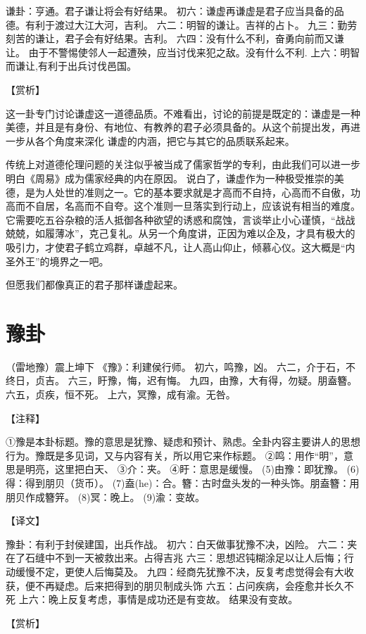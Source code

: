 \documentclass[12pt,UTF8]{ctexbook}
\begin{document}
谦卦：亨通。君子谦让将会有好结果。
初六：谦虚再谦虚是君子应当具备的品德。有利于渡过大江大河，吉利。
六二：明智的谦让。吉祥的占卜。
九三：勤劳刻苦的谦让，君子会有好结果。吉利。
六四：没有什么不利，奋勇向前而又谦让。 由于不警惕使邻人一起遭殃，应当讨伐来犯之敌。没有什么不利.
上六：明智而谦让,有利于出兵讨伐邑国。

【赏析】

这一卦专门讨论谦虚这一道德品质。不难看出，讨论的前提是既定的：谦虚是一种美德，并且是有身份、有地位、有教养的君子必须具备的。从这个前提出发，再进一步从各个角度来深化 谦虚的内涵，把它与其它的品质联系起来。

传统上对道德伦理问题的关注似乎被当成了儒家哲学的专利，由此我们可以进一步明白《周易》成为儒家经典的内在原因。 说白了，谦虚作为一种极受推崇的美德，是为人处世的准则之一。它的基本要求就是才高而不自持，心高而不自傲，功高而不自居，名高而不自夸。这个准则一旦落实到行动上，应该说有相当的难度。它需要吃五谷杂粮的活人抵御各种欲望的诱惑和腐蚀，言谈举止小心谨慎，“战战兢兢，如履薄冰”，克己复礼。从另一个角度讲，正因为难以企及，才具有极大的吸引力，才使君子鹤立鸡群，卓越不凡，让人高山仰止，倾慕心仪。这大概是“内圣外王”的境界之一吧。

但愿我们都像真正的君子那样谦虚起来。


\chapter{豫卦}

（雷地豫）震上坤下
《豫》：利建侯行师。
初六，鸣豫，凶。
六二，介于石，不终日，贞吉。
六三，盱豫，悔，迟有悔。
九四，由豫，大有得，勿疑。朋盍簪。
六五，贞疾，恒不死。
上六，冥豫，成有渝。无咎。

【注释】

①豫是本卦标题。豫的意思是犹豫、疑虑和预计、熟虑。全卦内容主要讲人的思想行为。豫既是多见词，又与内容有关，所以用它来作标题。
②鸣：用作“明”，意思是明亮，这里把白天、
③介：夹。
④盱：意思是缓慢。
(5)由豫：即犹豫。
(6)得：得到朋贝（货币）。
(7)盍(he)：合。簪：古时盘头发的一种头饰。朋盍簪：用朋贝作成簪笄。
(8)冥：晚上。
(9)渝：变故。

【译文】

豫卦：有利于封侯建国，出兵作战。
初六：白天做事犹豫不决，凶险。
六二：夹在了石缝中不到一天被救出来。占得吉兆
六三：思想迟钝糊涂足以让人后悔；行动缓慢不定，更使人后悔莫及。
九四：经商先犹豫不决，反复考虑觉得会有大收获，便不再疑虑。后来把得到的朋贝制成头饰
六五：占问疾病，会痊愈并长久不死
上六：晚上反复考虑，事情是成功还是有变故。 结果没有变故。

【赏析】
\end{document}
